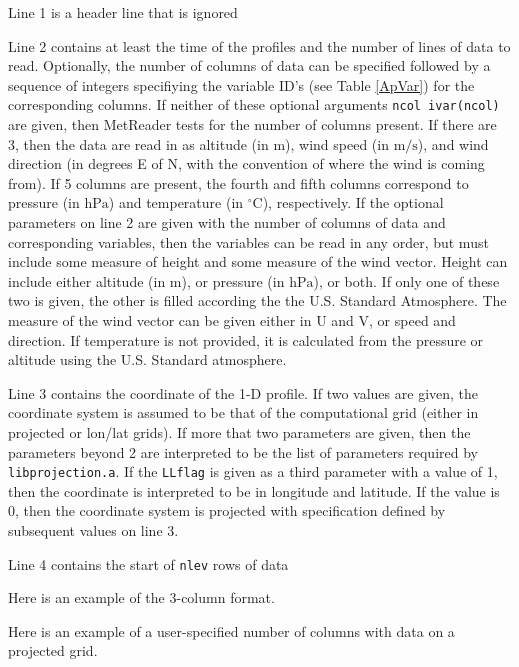 \documentclass[11pt]{article}   %
\begin{document}
Line 1 is a header line that is ignored

Line 2 contains at least the time of the profiles and the number of lines of data
to read.  Optionally, the number of columns of data can be specified followed by 
a sequence of integers specifiying the variable ID's (see Table \ref{ApVar}) for the corresponding
columns.  If neither of these optional arguments \texttt{ncol ivar(ncol)} are given,
then MetReader tests for the number of columns present.  If there are 3, then
the data are read in as altitude (in $\mathrm{m}$), wind speed (in $\mathrm{m/s}$), and 
wind direction (in degrees E of N, with the convention of where the wind is coming from).
If 5 columns are present, the fourth and fifth columns correspond to pressure (in $\mathrm{hPa}$)
and temperature (in $\mathrm{^{\circ}C}$), respectively.  If the optional parameters on line 2
are given with the number of columns of data and corresponding variables, then the variables
can be read in any order, but must include some measure of height and some measure of the 
wind vector.  Height can include either altitude (in $\mathrm{m}$), or pressure (in $\mathrm{hPa}$),
or both.  If only one of these two is given, the other is filled according the the U.S. Standard
Atmosphere.  The measure of the wind vector can be given either in U and V, or speed and direction.
If temperature is not provided, it is calculated from the pressure or altitude using the
U.S. Standard atmosphere.

Line 3 contains the coordinate of the 1-D profile.  If two values are given, the coordinate
system is assumed to be that of the computational grid (either in projected or lon/lat grids).
If more that two parameters are given, then the parameters beyond 2 are interpreted to be the list
of parameters required by \texttt{libprojection.a}.
If the \texttt{LLflag} is given as a third parameter with a value of 1, then the coordinate
is interpreted to be in longitude and latitude.  If the value is 0, then the coordinate system
is projected with specification defined by subsequent values on line 3.

Line 4 contains the start of \texttt{nlev} rows of data

Here is an example of the 3-column format.
\small  \normalsize

Here is an example of a user-specified number of columns with data on a 
projected grid.
\small  \normalsize
\end{document}
